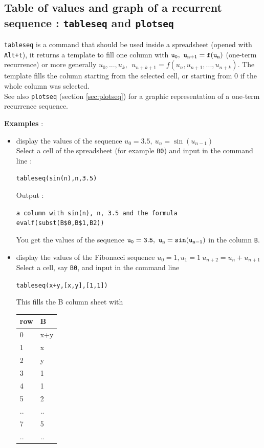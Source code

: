 \documentclass[a4paper,11pt]{book}
\begin{document}
\subsection{Table of values and graph of a recurrent sequence : {\tt tableseq} and {\tt plotseq}}
{\tt tableseq} is a command that should be used inside a spreadsheet
(opened with {\tt Alt+t}),
it returns a template to fill one column with
${\tt u_0, \ u_{n+1}=f(u_{n})}$ (one-term recurrence) or
more generally $u_0,...,u_k, \ \ u_{n+k+1}=f(u_n,u_{n+1},...,u_{n+k})$.
The template fills the column starting from the selected cell, or
starting from 0 if the whole column was selected.\\
See also {\tt plotseq} (section \ref{sec:plotseq}) for a graphic representation
of a one-term recurrence sequence.

{\bf Examples} :
\begin{itemize}
\item display the values of the sequence $u_0=3.5, \ u_n=\sin(u_{n-1})$\\
Select a cell of the spreadsheet (for example {\tt B0}) and 
 input in the command line :
\begin{center}{\tt tableseq(sin(n),n,3.5)}\end{center}
Output :
\begin{center}{\tt a column with sin(n), n, 3.5 
and the formula evalf(subst(B\$0,B\$1,B2))}
\end{center} 
You get the values of the sequence 
${\tt u_0=3.5,\ u_n=sin(u_{n-1})}$ in the column 
{\tt B}.
\item 
display the values of the Fibonacci sequence 
$u_0=1, u_1=1 \ u_{n+2}=u_n+u_{n+1}$\\
Select a cell, say {\tt B0}, and input in the command line 
\begin{center}{\tt tableseq(x+y,[x,y],[1,1])}\end{center}
This fills the B column sheet with
\begin{center}{\tt \begin{tabular}{|l|l|}
\hline
row &B\\
\hline
0 &x+y \\
\hline
1 & x\\
\hline
2 & y\\
\hline
3 & 1\\
\hline
4 & 1\\
\hline
5 & 2\\
\hline
.. &..\\
\hline
7 & 5\\
\hline
.. &..\\
\hline
\end{tabular}}\end{center}
\end{itemize}
\end{document}
